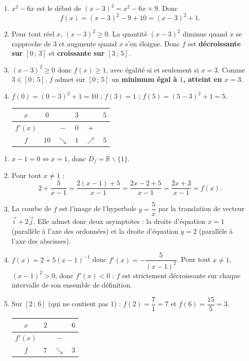 \documentclass[11pt]{article}
\def\setminus{\mathbin{\backslash}}\let\smallsetminus\setminus
\begin{document}
\begin{corrige}
\begin{enumerate}
\item $x^{2}-6x$ est le début de $(x-3)^{2}=x^{2}-6x+9$. Donc
\[ f(x)=(x-3)^{2}-9+10=(x-3)^{2}+1. \]
\item Pour tout réel $x$, $(x-3)^{2}\geq 0$. La quantité $(x-3)^{2}$ diminue quand $x$ se rapproche de $3$ et augmente quand $x$ s'en éloigne. Donc $f$ est \textbf{décroissante sur $[0\,;\,3]$} et \textbf{croissante sur $[3\,;\,5]$}.
\item $(x-3)^{2}\geq 0$ donc $f(x)\geq 1$, avec égalité si et seulement si $x=3$. Comme $3\in[0\,;\,5]$, $f$ admet sur $[0\,;\,5]$ un \textbf{minimum égal à $1$, atteint en $x=3$}.
\item $f(0)=(0-3)^{2}+1=10$ ; $f(3)=1$ ; $f(5)=(5-3)^{2}+1=5$.
\begin{center}
\begin{tabular}{|c|ccccc|}\hline $x$ & $0$ & & $3$ & & $5$ \\ \hline $f'(x)$ & & $-$ & $0$ & $+$ & \\ \hline $f$ & $10$ & $\searrow$ & $1$ & $\nearrow$ & $5$ \\ \hline\end{tabular}
\end{center}
\end{enumerate}
\end{corrige}

\begin{corrige}
\begin{enumerate}
\item $x-1=0\Leftrightarrow x=1$, donc $D_{f}=\mathbb{R}\setminus\{1\}$.
\item Pour tout $x\neq 1$ :
\[ 2+\frac{5}{x-1}=\frac{2(x-1)+5}{x-1}=\frac{2x-2+5}{x-1}=\frac{2x+3}{x-1}=f(x). \]
\item La courbe de $f$ est l'image de l'hyperbole $y=\dfrac{5}{x}$ par la translation de vecteur $\vec{i}+2\vec{j}$. Elle admet donc deux asymptotes : la droite d'équation $x=1$ (parallèle à l'axe des ordonnées) et la droite d'équation $y=2$ (parallèle à l'axe des abscisses).
\item $f(x)=2+5(x-1)^{-1}$ donc $f'(x)=-\dfrac{5}{(x-1)^{2}}$. Pour tout $x\neq 1$, $(x-1)^{2}>0$, donc $f'(x)<0$ : $f$ est strictement décroissante sur chaque intervalle de son ensemble de définition.
\item Sur $[2\,;\,6]$ (qui ne contient pas $1$) : $f(2)=\dfrac{7}{1}=7$ et $f(6)=\dfrac{15}{5}=3$.
\begin{center}
\begin{tabular}{|c|ccc|}\hline $x$ & $2$ & & $6$ \\ \hline $f'(x)$ & & $-$ & \\ \hline $f$ & $7$ & $\searrow$ & $3$ \\ \hline\end{tabular}
\end{center}
\end{enumerate}
\end{corrige}
\end{document}
